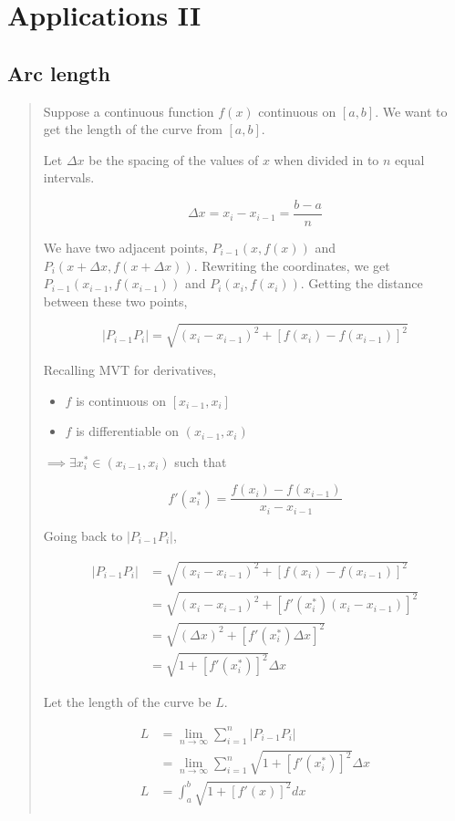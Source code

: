 \documentclass[
]{article}
\begin{document}
\hypertarget{applications-ii}{%
\section{Applications II}\label{applications-ii}}

\hypertarget{arc-length}{%
\subsection{Arc length}\label{arc-length}}

\begin{quote}
Suppose a continuous function \(f(x)\) continuous on \([a,b]\). We want
to get the length of the curve from \([a,b]\).

Let \(\Delta x\) be the spacing of the values of \(x\) when divided in
to \(n\) equal intervals.

\[\Delta x = x_i - x_{i-1} = \frac{b-a}{n} \]

We have two adjacent points, \(P_{i-1}(x, f(x))\) and
\(P_i(x+\Delta x, f(x + \Delta x))\). Rewriting the coordinates, we get
\(P_{i-1}(x_{i-1}, f(x_{i-1}))\) and \(P_i(x_i, f(x_i))\). Getting the
distance between these two points,

\[|P_{i-1}P_i| = \sqrt{(x_i-x_{i-1})^2 + \left[ f(x_i)-f(x_{i-1}) \right]^2}\]

Recalling MVT for derivatives,

\begin{itemize}
\item
  \(f\) is continuous on \([x_{i-1},x_i]\)
\item
  \(f\) is differentiable on \((x_{i-1},x_i)\)
\end{itemize}

\(\implies \exists x_i^* \in (x_{i-1},x_i)\) such that

\[f'(x_i^*) = \frac{f(x_i) - f(x_{i-1})}{x_i - x_{i-1}}\]

Going back to \(|P_{i-1}P_i|\),

\begin{align*}
|P_{i-1}P_i| &= \sqrt{(x_i-x_{i-1})^2 + \left[ f(x_i)-f(x_{i-1}) \right]^2}\\
&= \sqrt{(x_i-x_{i-1})^2 + \left[ f'(x_i^*) (x_i - x_{i-1}) \right]^2}\\
&= \sqrt{(\Delta x)^2 + \left[ f'(x_i^*) \Delta x \right]^2}\\
&= \sqrt{1+[f'(x_i^*)]^2}\Delta x
\end{align*}

Let the length of the curve be \(L\).

\begin{align*}
L &= \lim_{n\to\infty} \sum_{i=1}^n |P_{i-1}P_i|\\
&= \lim_{n\to\infty} \sum_{i=1}^n \sqrt{1+[f'(x_i^*)]^2}\Delta x\\
L &= \int_a^b \sqrt{1+[f'(x)]^2}dx\\
\end{align*}
\end{quote}
\end{document}
